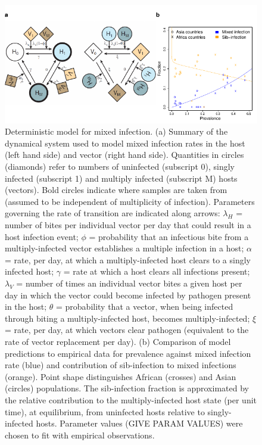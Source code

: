 \documentclass[9pt,lineno]{elife}
\begin{document}
\begin{figure}[h]
  \centering{}
  \includegraphics[width=\textwidth]{Fig6.pdf}
  \caption{Deterministic model for mixed infection.  (a) Summary of the dynamical system used to model mixed infection rates in the host (left hand side) and vector (right hand side).  Quantities in circles (diamonds) refer to numbers of uninfected (subscript 0), singly infected (subscript 1) and multiply infected (subscript M) hosts (vectors).  Bold circles indicate where samples are taken from (assumed to be independent of multiplicity of infection).  Parameters governing the rate of transition are indicated along arrows: $\lambda_H$ = number of bites per individual vector per day that could result in a host infection event; $\phi$ = probability that an infectious bite from a multiply-infected vector establishes a multiple infection in a host; $\alpha$ = rate, per day, at which a multiply-infected host clears to a singly infected host; $\gamma$ = rate at which a host clears all infections present; $\lambda_V$ = number of times an individual vector bites a given host per day in which the vector could become infected by pathogen present in the host; $\theta$ = probability that a vector, when being infected through biting a multiply-infected host, becomes multiply-infected; $\xi$ = rate, per day, at which vectors clear pathogen (equivalent to the rate of vector replacement per day).  (b) Comparison of model predictions to empirical data for prevalence against mixed infection rate (blue) and contribution of sib-infection to mixed infections (orange).  Point shape distinguishes African (crosses) and Asian (circles) populations.  The sib-infection fraction is approximated by the relative contribution to the multiply-infected host state (per unit time), at equilibrium, from uninfected hosts relative to singly-infected hosts.  Parameter values (GIVE PARAM VALUES) were chosen to fit with empirical observations.}
  \label{fig:model}
\end{figure}
\end{document}

